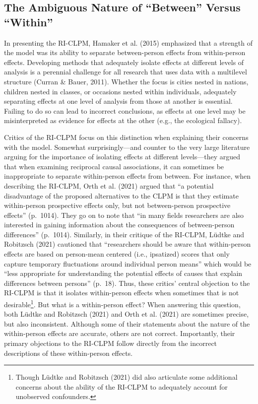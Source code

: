 \documentclass[
  english,
  man,floatsintext]{apa6}
\begin{document}
\hypertarget{the-ambiguous-nature-of-between-versus-within}{%
\subsection{The Ambiguous Nature of ``Between'' Versus ``Within''}\label{the-ambiguous-nature-of-between-versus-within}}

In presenting the RI-CLPM, Hamaker et al. (2015) emphasized that a strength of the model was its ability to separate between-person effects from within-person effects. Developing methods that adequately isolate effects at different levels of analysis is a perennial challenge for all research that uses data with a multilevel structure (Curran \& Bauer, 2011). Whether the focus is cities nested in nations, children nested in classes, or occasions nested within individuals, adequately separating effects at one level of analysis from those at another is essential. Failing to do so can lead to incorrect conclusions, as effects at one level may be misinterpreted as evidence for effects at the other (e.g., the ecological fallacy).

Critics of the RI-CLPM focus on this distinction when explaining their concerns with the model. Somewhat surprisingly---and counter to the very large literature arguing for the importance of isolating effects at different levels---they argued that when examining reciprocal causal associations, it can sometimes be inappropriate to separate within-person effects from between. For instance, when describing the RI-CLPM, Orth et al. (2021) argued that ``a potential disadvantage of the proposed alternatives to the CLPM is that they estimate within-person prospective effects only, but not between-person prospective effects'' (p.~1014). They go on to note that ``in many fields researchers are also interested in gaining information about the consequences of between-person differences'' (p.~1014). Similarly, in their critique of the RI-CLPM, Lüdtke and Robitzsch (2021) cautioned that ``researchers should be aware that within-person effects are based on person-mean centered (i.e., ipsatized) scores that only capture temporary fluctuations around individual person means'' which would be ``less appropriate for understanding the potential effects of causes that explain differences between persons'' (p.~18). Thus, these critics' central objection to the RI-CLPM is that it isolates within-person effects when sometimes that is not desirable\footnote{Though Lüdtke and Robitzsch (2021) did also articulate some additional concerns about the ability of the RI-CLPM to adequately account for unobserved confounders.}. But what is a within-person effect? When answering this question, both Lüdtke and Robitzsch (2021) and Orth et al. (2021) are sometimes precise, but also inconsistent. Although some of their statements about the nature of the within-person effects are accurate, others are not correct. Importantly, their primary objections to the RI-CLPM follow directly from the incorrect descriptions of these within-person effects.
\end{document}
